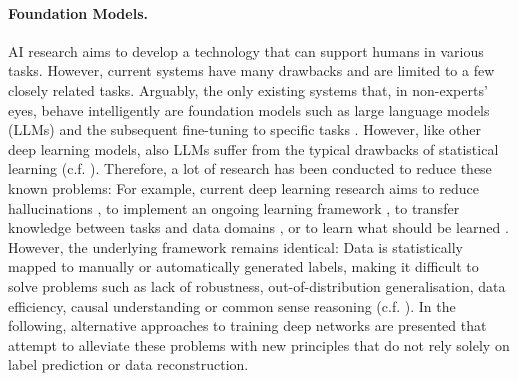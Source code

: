 \paragraph{Foundation Models.} AI research aims to develop a technology that can support humans in various tasks. However, current systems have many drawbacks and are limited to a few closely related tasks. Arguably, the only existing systems that, in non-experts' eyes, behave intelligently are foundation models such as large language models (LLMs) \cite{NEURIPS2020_1457c0d6, Touvron_Lavril_Izacard_Martinet_Lachaux_Lacroix_Rozière_Goyal_Hambro_Azhar} and the subsequent fine-tuning to specific tasks \cite{Ouyang_Wu_Jiang_Almeida_Wainwright_Mishkin_Zhang_Agarwal_Slama_Ray}. However, like other deep learning models, also LLMs suffer from the typical drawbacks of statistical learning (c.f. ). Therefore, a lot of research has been conducted to reduce these known problems: For example, current deep learning research aims to reduce hallucinations \cite{Feldman_Foulds_Pan_2023, Manakul_Liusie_Gales_2023}, to implement an ongoing learning framework \cite{Sahoo_Pham_Lu_Hoi_2017, Hoi_Sahoo_Lu_Zhao_2021}, to transfer knowledge between tasks and data domains \cite{Zhuang_Qi_Duan_Xi_Zhu_Zhu_Xiong_He_2021, Sager_Salzmann_Burn_Stadelmann_2022}, or to learn what should be learned \cite{Thrun_Pratt_1998, Hospedales_Antoniou_Micaelli_Storkey_2021}. However, the underlying framework remains identical: Data is statistically mapped to manually or automatically generated labels, making it difficult to solve problems such as lack of robustness,  out-of-distribution generalisation, data efficiency, causal understanding or common sense reasoning (c.f. ). In the following, alternative approaches to training deep networks are presented that attempt to alleviate these problems with new principles that do not rely solely on label prediction or data reconstruction. 

